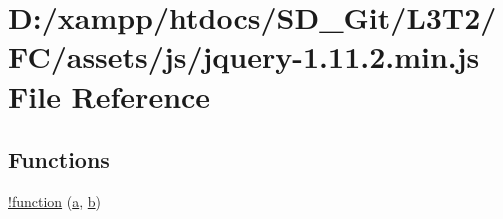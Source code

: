 \hypertarget{jquery-1_811_82_8min_8js}{}\section{D\+:/xampp/htdocs/\+S\+D\+\_\+\+Git/\+L3\+T2/\+F\+C/assets/js/jquery-\/1.11.2.min.\+js File Reference}
\label{jquery-1_811_82_8min_8js}
\subsection*{Functions}
\begin{DoxyCompactItemize}
\item 
\hyperlink{jquery-1_811_82_8min_8js_a43f0b96ea8ec44ca20ba86809a785614}{!function} (\hyperlink{bootstrap_8min_8js_a1f5870dcf487187f13d5fd328ed9e6e7}{a}, \hyperlink{bootstrap_8min_8js_a398bb8542498d1b14178b02b99df309b}{b})
\item 

\end{DoxyCompactItemize}

